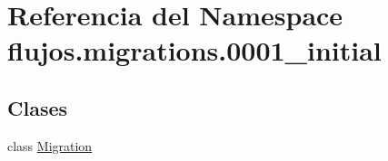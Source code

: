 \hypertarget{namespaceflujos_1_1migrations_1_10001__initial}{}\section{Referencia del Namespace flujos.\+migrations.0001\+\_\+initial}
\label{namespaceflujos_1_1migrations_1_10001__initial}
\subsection*{Clases}
\begin{DoxyCompactItemize}
\item 
class \hyperlink{classflujos_1_1migrations_1_10001__initial_1_1_migration}{Migration}
\end{DoxyCompactItemize}
